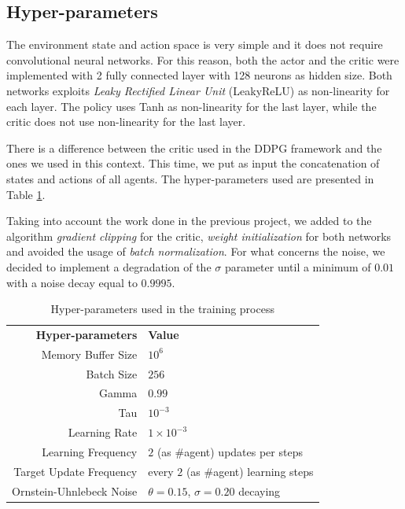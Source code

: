 \documentclass[letterpaper]{article}
\begin{document}
\subsection{Hyper-parameters}

The environment state and action space is very simple and it does not require convolutional neural networks. For this reason, both the actor and the critic were implemented with 2 fully connected layer with 128 neurons as hidden size. Both networks exploits \textit{Leaky Rectified Linear Unit} (LeakyReLU) as non-linearity for each layer. The policy uses Tanh as non-linearity for the last layer, while the critic does not use non-linearity for the last layer.

There is a difference between the critic used in the DDPG framework and the ones we used in this context. This time, we put as input the concatenation of states and actions of all agents.
The hyper-parameters used are presented in Table \ref{table:hp}.

Taking into account the work done in the previous project, we added to the algorithm \textit{gradient clipping} for the critic, \textit{weight initialization} for both networks and avoided the usage of \textit{batch normalization}.
For what concerns the noise, we decided to implement a degradation of the $\sigma$ parameter until a minimum of $0.01$ with a noise decay equal to $0.9995$.

\begin{table}[]
\begin{tabular}{rl}
\textbf{Hyper-parameters}    & \textbf{Value}        \\
Memory Buffer Size          & $10^6$ \\
Batch Size                  & $256$                    \\
Gamma                       & $0.99$                  \\
Tau                         & $10^{-3}$                 \\
Learning Rate               & $1\times 10^{-3}$                  \\
Learning Frequency          & $2$ (as \#agent) updates per steps       \\
Target Update Frequency        & every $2$ (as \#agent) learning steps           \\

Ornstein-Uhnlebeck Noise &  $\theta=0.15$, $\sigma=0.20$ decaying
\end{tabular}
\caption{Hyper-parameters used in the training process}
\label{table:hp}
\end{table}
\end{document}
